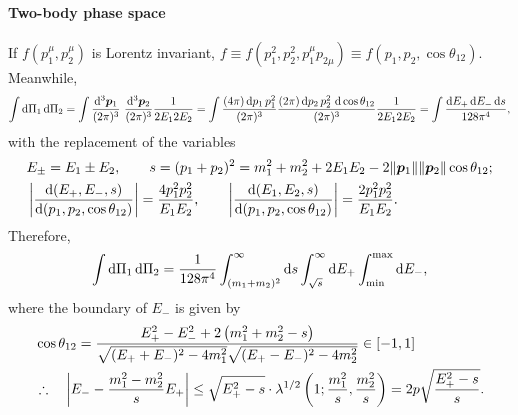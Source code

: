 \documentclass[CheatSheet]{subfiles}
\begin{document}
\paragraph{Two-body phase space}
If $f(p_1^\mu,p_2^\mu)$ is Lorentz invariant, $f\equiv f(p_1^2,p_2^2,p_1^\mu p_{2\mu})\equiv f(p_1,p_2,\cos\theta_{12})$.
Meanwhile,
\begin{equation}
 \int\dd\Pi_1\dd\Pi_2
=
\int\ddP{p_1}\,\,\ddP{p_2}\frac{1}{2E_12E_2}
=
\int\frac{(4\pi)\dd p_1\,p_1^2}{(2\pi)^3}
\frac{(2\pi)\dd p_2\,p_2^2\,\dd\cos\theta_{12}}{(2\pi)^3}\frac{1}{2E_12E_2}
=
\int\frac{\dd E_+\dd E_- \dd s}{128\pi^4},
\end{equation}
with the replacement of the variables
\begin{align*}
& E_\pm = E_1\pm E_2,
\qquad
s=(p_1+p_2)^2=m_1^2 + m_2^2 + 2E_1E_2 - 2\|{\boldsymbol{p}}_1\|\|{\boldsymbol{p}}_2\|\cos\theta_{12};\\
&
\left|\frac{\mathop{}\!\mathrm{d}(E_+,E_-,s)}{\mathop{}\!\mathrm{d}(p_1, p_2, \cos\theta_{12})}\right|=\frac{4p_1^2p_2^2}{E_1E_2},
\qquad
\left|\frac{\mathop{}\!\mathrm{d}(E_1,E_2,s)}{\mathop{}\!\mathrm{d}(p_1, p_2, \cos\theta_{12})}\right|=\frac{2p_1^2p_2^2}{E_1E_2}.
\end{align*}
Therefore, 
\begin{equation}
 \int\mathop{}\!\mathrm{d}\Pi_1\mathop{}\!\mathrm{d}\Pi_2
=
\frac{1}{128\pi^4}
\int_{(m_1+m_2)^2}^\infty\mathop{}\!\mathrm{d} s
\int_{\sqrt{s}}^\infty\mathop{}\!\mathrm{d} E_+
\int_{\text{min}}^{\mathrm{max}}\mathop{}\!\mathrm{d} E_-,
\end{equation}
where the boundary of $E_-$ is given by
\begin{align*}
 &\cos\theta_{12}=\frac{E_+^2-E_-^2+2 \left(m_1^2+m_2^2-s\right)}{\sqrt{(E_++E_-)^2-4 m_1^2}\sqrt{(E_+-E_-)^2-4 m_2^2}} \in [-1,1]\\
 &\therefore\quad
\left|E_- - \frac{m_1^2-m_2^2}{s}E_+\right| 
\le
\sqrt{E_+^2-s}\cdot\Kallen[1/2]\left(1;\frac{m_1^2}{s},\frac{m_2^2}{s}\right)
=
2p\sqrt{\frac{E_+^2-s}{s}}.
\end{align*}
\end{document}
